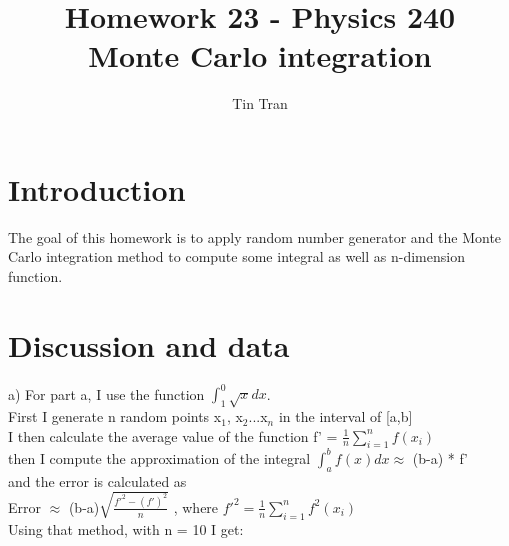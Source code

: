 \documentclass{article}
\begin{document}
\title{Homework 23 - Physics 240\\
		Monte Carlo integration}
\author{Tin Tran}

\maketitle

\section{Introduction}
The goal of this homework is to apply random number generator and the Monte Carlo integration method to compute some integral as well as n-dimension function.

\section{Discussion and data}
a) For part a, I use the function $\int_1^0\sqrt{x}dx$.\\
First I generate n random points x$_1$, x$_2$...x$_n$ in the interval of [a,b]\\
I then calculate the average value of the function f' = $\frac{1}{n}\sum\limits^{n}_{i=1}f(x_i)$\\
then I compute the approximation of the integral
$\int_a^bf(x)dx \approx$ (b-a) * f'\\
and the error is calculated as \\
Error $\approx$ (b-a)$\sqrt{\frac{f'^2 - (f')^2}{n}}$ , where $f'^2 = \frac{1}{n}\sum\limits^{n}_{i=1}f^2(x_i)$\\
Using that method, with n = 10 I get:
\begin{figure}[H]
\end{figure}
\end{document}
